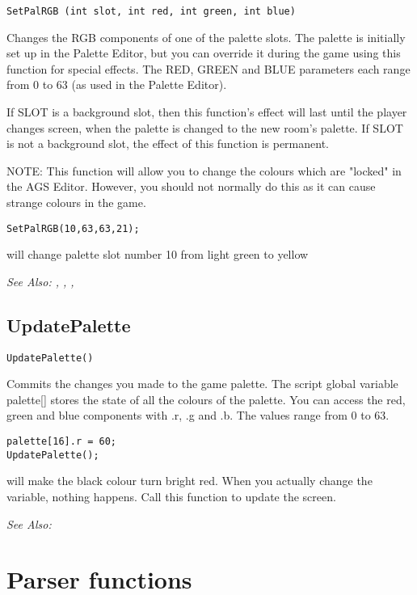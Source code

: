 \begin{verbatim}
SetPalRGB (int slot, int red, int green, int blue)
\end{verbatim}
Changes the RGB components of one of the palette slots. The palette is
initially set up in the Palette Editor, but you can override it during the game using
this function for special effects. The RED, GREEN and BLUE parameters each
range from 0 to 63 (as used in the Palette Editor).

If SLOT is a background slot, then this function's effect will last until
the player changes screen, when the palette is changed to the new room's
palette. If SLOT is not a background slot, the effect of this function is
permanent.

NOTE: This function will allow you to change the colours which are "locked"
in the AGS Editor. However, you should not normally do this as it can
cause strange colours in the game.

\begin{verbatim}
SetPalRGB(10,63,63,21);
\end{verbatim}
will change palette slot number 10 from light green to yellow

\it{See Also:} , , , 

\subsection{UpdatePalette}\label{UpdatePalette}%

\begin{verbatim}
UpdatePalette()
\end{verbatim}
Commits the changes you made to the game palette.
The script global variable  palette[]  stores the state of all the
colours of the palette. You can access the red, green and blue components
with .r, .g and .b. The values range from 0 to 63.

\begin{verbatim}
palette[16].r = 60;
UpdatePalette();
\end{verbatim}
will make the black colour turn bright red. When you actually change the variable, nothing happens. Call this function to update the screen.

\it{See Also:} 


\section{Parser functions}%


